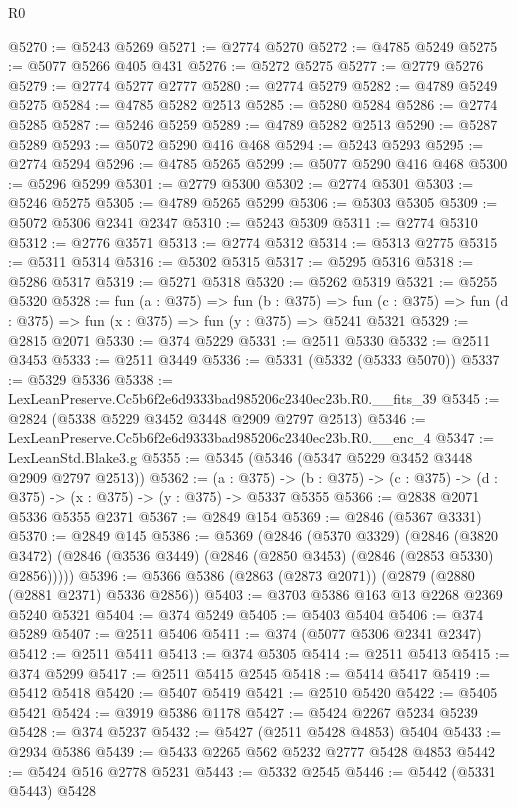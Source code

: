 \begin{lexlean}{R0}
\begin{coremodule}
@5270 := @5243 @5269
@5271 := @2774 @5270
@5272 := @4785 @5249
@5275 := @5077 @5266 @405 @431
@5276 := @5272 @5275
@5277 := @2779 @5276
@5279 := @2774 @5277 @2777
@5280 := @2774 @5279
@5282 := @4789 @5249 @5275
@5284 := @4785 @5282 @2513
@5285 := @5280 @5284
@5286 := @2774 @5285
@5287 := @5246 @5259
@5289 := @4789 @5282 @2513
@5290 := @5287 @5289
@5293 := @5072 @5290 @416 @468
@5294 := @5243 @5293
@5295 := @2774 @5294
@5296 := @4785 @5265
@5299 := @5077 @5290 @416 @468
@5300 := @5296 @5299
@5301 := @2779 @5300
@5302 := @2774 @5301
@5303 := @5246 @5275
@5305 := @4789 @5265 @5299
@5306 := @5303 @5305
@5309 := @5072 @5306 @2341 @2347
@5310 := @5243 @5309
@5311 := @2774 @5310
@5312 := @2776 @3571
@5313 := @2774 @5312
@5314 := @5313 @2775
@5315 := @5311 @5314
@5316 := @5302 @5315
@5317 := @5295 @5316
@5318 := @5286 @5317
@5319 := @5271 @5318
@5320 := @5262 @5319
@5321 := @5255 @5320
@5328 := fun (a : @375) =>
  fun (b : @375) =>
  fun (c : @375) => fun (d : @375) => fun (x : @375) => fun (y : @375) => @5241 @5321
@5329 := @2815 @2071
@5330 := @374 @5229
@5331 := @2511 @5330
@5332 := @2511 @3453
@5333 := @2511 @3449
@5336 := @5331 (@5332 (@5333 @5070))
@5337 := @5329 @5336
@5338 := LexLeanPreserve.Cc5b6f2e6d9333bad985206c2340ec23b.R0.__fits_39
@5345 := @2824 (@5338 @5229 @3452 @3448 @2909 @2797 @2513)
@5346 := LexLeanPreserve.Cc5b6f2e6d9333bad985206c2340ec23b.R0.__enc_4
@5347 := LexLeanStd.Blake3.g
@5355 := @5345 (@5346 (@5347 @5229 @3452 @3448 @2909 @2797 @2513))
@5362 := (a : @375) ->
  (b : @375) -> (c : @375) -> (d : @375) -> (x : @375) -> (y : @375) -> @5337 @5355
@5366 := @2838 @2071 @5336 @5355 @2371
@5367 := @2849 @154
@5369 := @2846 (@5367 @3331)
@5370 := @2849 @145
@5386 := @5369
    (@2846
      (@5370 @3329)
      (@2846 (@3820 @3472) (@2846 (@3536 @3449) (@2846 (@2850 @3453) (@2846 (@2853 @5330) @2856)))))
@5396 := @5366 @5386 (@2863 (@2873 @2071)) (@2879 (@2880 (@2881 @2371) @5336 @2856))
@5403 := @3703 @5386 @163 @13 @2268 @2369 @5240 @5321
@5404 := @374 @5249
@5405 := @5403 @5404
@5406 := @374 @5289
@5407 := @2511 @5406
@5411 := @374 (@5077 @5306 @2341 @2347)
@5412 := @2511 @5411
@5413 := @374 @5305
@5414 := @2511 @5413
@5415 := @374 @5299
@5417 := @2511 @5415 @2545
@5418 := @5414 @5417
@5419 := @5412 @5418
@5420 := @5407 @5419
@5421 := @2510 @5420
@5422 := @5405 @5421
@5424 := @3919 @5386 @1178
@5427 := @5424 @2267 @5234 @5239
@5428 := @374 @5237
@5432 := @5427 (@2511 @5428 @4853) @5404
@5433 := @2934 @5386
@5439 := @5433 @2265 @562 @5232 @2777 @5428 @4853
@5442 := @5424 @516 @2778 @5231
@5443 := @5332 @2545
@5446 := @5442 (@5331 @5443) @5428

\end{coremodule}
\end{lexlean}
